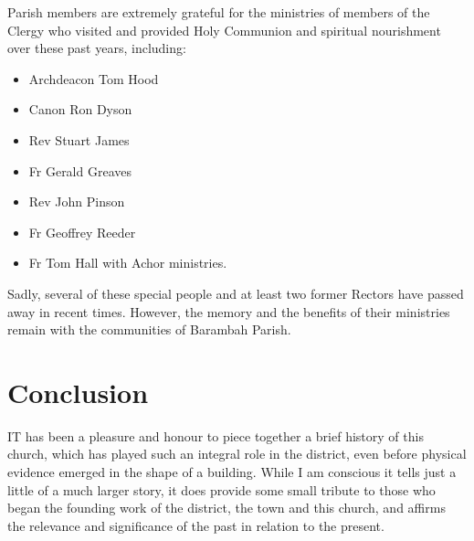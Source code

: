 Parish members are extremely grateful for the ministries of members of the Clergy who visited and provided Holy Communion and spiritual nourishment over these past years, including:



\begin{itemize}

\item

  Archdeacon Tom Hood

\item

  Canon Ron Dyson

\item

  Rev Stuart James

\item

  Fr Gerald Greaves

\item

  Rev John Pinson

\item

  Fr Geoffrey Reeder

\item

  Fr Tom Hall with Achor ministries.

\end{itemize}



\smallskip


Sadly, several of these special people and at least two former Rectors have passed away in recent times. However, the memory and the benefits of their ministries remain with the communities of Barambah Parish.



\printendnotes[custom]
\setcounter{endnote}{0}




\chapter{Conclusion}
\nobalance


\lettrine[lines=3]{I}{T}
 has been a pleasure and honour to piece together a brief history of this church, which has played such an integral role in the district, even before physical evidence emerged in the shape of a building. While I am conscious it tells just a little of a much larger story, it does provide some small tribute to those who began the founding work of the district, the town and this church, and affirms the relevance and significance of the past in relation to the present.

